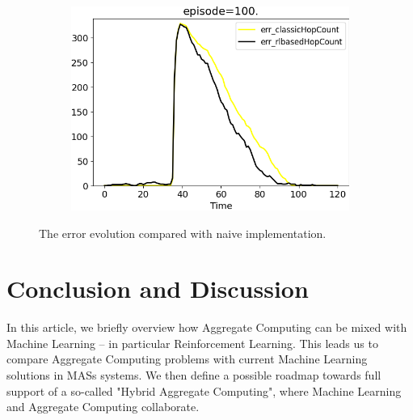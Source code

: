\documentclass[
  twocolumn,
]{ceurart}
\begin{document}
\begin{figure}
\begin{subfigure}[b]{0.3\textwidth}
      \label{fig:three sin x}
  \end{subfigure}
  \hfill
  \begin{subfigure}[b]{0.3\textwidth}
      \centering
      \includegraphics[width=\textwidth]{img/100}
      \label{fig:five over x}
  \end{subfigure}
     \caption{The error evolution compared with naive implementation.}
\end{figure}

\section{Conclusion and Discussion}
In this article, we briefly overview how Aggregate Computing can be mixed with Machine Learning -- in particular Reinforcement 
Learning. This leads us to compare Aggregate Computing problems with current Machine Learning solutions in MASs systems.
We then define a possible roadmap towards full support of a so-called "Hybrid Aggregate Computing", where Machine Learning
and Aggregate Computing collaborate.
\nocite{*}


\appendix
\end{document}
